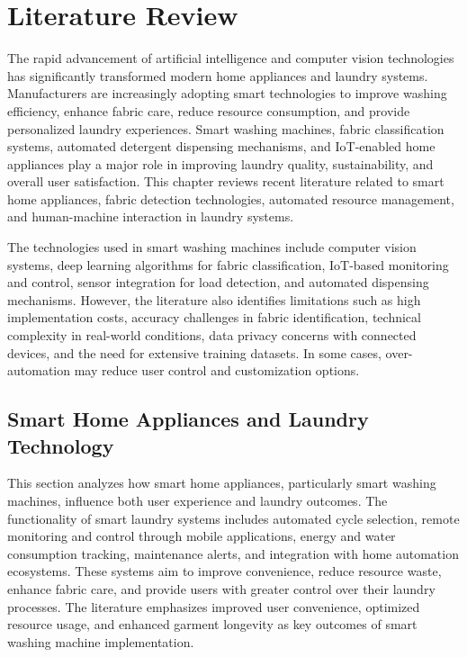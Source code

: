 \chapter{Literature Review}

The rapid advancement of artificial intelligence and computer vision technologies has significantly transformed modern home appliances and laundry systems. Manufacturers are increasingly adopting smart technologies to improve washing efficiency, enhance fabric care, reduce resource consumption, and provide personalized laundry experiences. Smart washing machines, fabric classification systems, automated detergent dispensing mechanisms, and IoT-enabled home appliances play a major role in improving laundry quality, sustainability, and overall user satisfaction. This chapter reviews recent literature related to smart home appliances, fabric detection technologies, automated resource management, and human-machine interaction in laundry systems.

\noindent
The technologies used in smart washing machines include computer vision systems, deep learning algorithms for fabric classification, IoT-based monitoring and control, sensor integration for load detection, and automated dispensing mechanisms. However, the literature also identifies limitations such as high implementation costs, accuracy challenges in fabric identification, technical complexity in real-world conditions, data privacy concerns with connected devices, and the need for extensive training datasets. In some cases, over-automation may reduce user control and customization options.

\section{Smart Home Appliances and Laundry Technology}

This section analyzes how smart home appliances, particularly smart washing machines, influence both user experience and laundry outcomes. The functionality of smart laundry systems includes automated cycle selection, remote monitoring and control through mobile applications, energy and water consumption tracking, maintenance alerts, and integration with home automation ecosystems. These systems aim to improve convenience, reduce resource waste, enhance fabric care, and provide users with greater control over their laundry processes. The literature emphasizes improved user convenience, optimized resource usage, and enhanced garment longevity as key outcomes of smart washing machine implementation.

